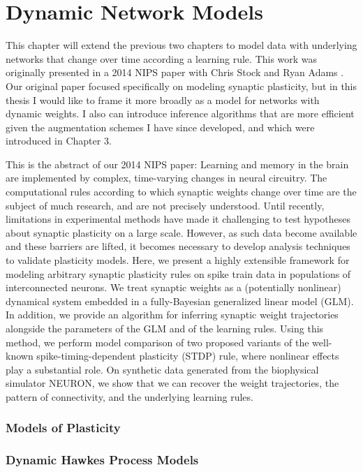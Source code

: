 
\chapter{Dynamic Network Models}

This chapter will extend the previous two chapters to model data with 
underlying networks that change over time according a learning rule. 
This work was originally presented in a 2014 NIPS paper with Chris Stock
and Ryan Adams \cite{linderman2014framework}. Our original paper 
focused specifically on modeling synaptic plasticity, but in this 
thesis I would like to frame it more broadly as a model for networks 
with dynamic weights. I also can introduce inference algorithms that 
are more efficient given the \polyagamma augmentation schemes I have 
since developed, and which were introduced in Chapter 3.

This is the abstract of our 2014 NIPS paper:
Learning and memory in the brain are implemented by complex,
time-varying changes in neural circuitry. The computational rules
according to which synaptic weights change over time are the subject
of much research, and are not precisely understood. Until recently,
limitations in experimental methods have made it challenging to test
hypotheses about synaptic plasticity on a large scale.  However, as
such data become available and these barriers are lifted, it becomes
necessary to develop analysis techniques to validate plasticity
models.  Here, we present a highly extensible framework for modeling
arbitrary synaptic plasticity rules on spike train data in populations
of interconnected neurons. We treat synaptic weights as a (potentially
nonlinear) dynamical system embedded in a fully-Bayesian generalized
linear model (GLM). In addition, we provide an algorithm for inferring
synaptic weight trajectories alongside the parameters of the GLM and
of the learning rules. Using this method, we perform model comparison
of two proposed variants of the well-known spike-timing-dependent
plasticity (STDP) rule, where nonlinear effects play a substantial
role. On synthetic data generated from the biophysical simulator
NEURON, we show that we can recover the weight trajectories, the
pattern of connectivity, and the underlying learning rules.

\subsection{Models of Plasticity}

\subsection{Dynamic Hawkes Process Models}

